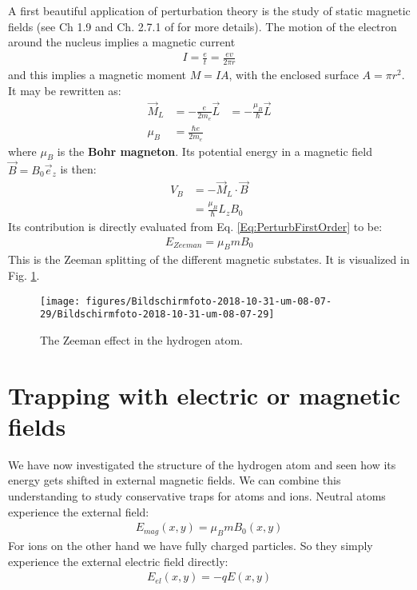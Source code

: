 \documentclass[10pt]{article}
\let\cite\citep
\providecommand\citep{\cite}
\begin{document}
A first beautiful application of perturbation theory is the study of static magnetic fields (see Ch 1.9 and Ch. 2.7.1 of \cite{Hertel_2015} for more details). 
The motion of the electron around the nucleus implies a magnetic current
\begin{align}
I = \frac{e}{t} = \frac{ev}{2\pi r}
\end{align}
and this implies a magnetic moment $M = I A$, with the enclosed surface $A=\pi r^2$. It may be rewritten as:
\begin{align}
\vec{M}_L &= -\frac{e}{2m_e}\vec{L} &=-\frac{\mu_B}{\hbar} \vec{L} \\
\mu_B &= \frac{\hbar e}{2m_e}
\end{align}
where $\mu_B$ is the \textbf{Bohr magneton}. Its potential energy in a magnetic field $\vec{B} = B_0 \vec{e}_z$ is then:
\begin{align}
V_B &= -\vec{M}_L\cdot \vec{B}\\
&= \frac{\mu_B}{\hbar} L_z B_0
\end{align}
Its contribution is directly evaluated from Eq. \eqref{Eq:PerturbFirstOrder} to be:
\begin{align}
E_{Zeeman} = \mu_B m B_0
\end{align}
This is the Zeeman splitting of the different magnetic substates. It is visualized in Fig. \ref{982283}.
\begin{figure}[h!]
\begin{center}
\texttt{[image: figures/Bildschirmfoto-2018-10-31-um-08-07-29/Bildschirmfoto-2018-10-31-um-08-07-29]}
\caption{{The Zeeman effect in the hydrogen atom.
{\label{982283}}%
}}
\end{center}
\end{figure}




\section{Trapping with electric or magnetic fields}
We have now investigated the structure of the hydrogen atom and seen how its energy gets shifted in external magnetic fields. We  can combine this understanding to study conservative traps for atoms and ions. Neutral atoms experience the external field:
\begin{align}
E_{mag}(x,y) = \mu_B m B_0(x,y)
\end{align}
For ions on the other hand we have fully charged particles. So they simply experience the external electric field directly:
\begin{align}
E_{el}(x,y) = -q E(x,y)
\end{align}
\end{document}
